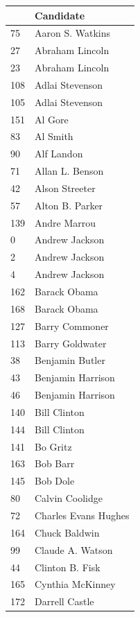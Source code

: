\documentclass[
  letterpaper,
  DIV=11,
  numbers=noendperiod]{scrreprt}
\begin{document}
\begin{tabular}{ll}
\toprule
{} &               Candidate \\
\midrule
75  &        Aaron S. Watkins \\
27  &         Abraham Lincoln \\
23  &         Abraham Lincoln \\
108 &         Adlai Stevenson \\
105 &         Adlai Stevenson \\
151 &                 Al Gore \\
83  &                Al Smith \\
90  &              Alf Landon \\
71  &         Allan L. Benson \\
42  &          Alson Streeter \\
57  &         Alton B. Parker \\
139 &            Andre Marrou \\
0   &          Andrew Jackson \\
2   &          Andrew Jackson \\
4   &          Andrew Jackson \\
162 &            Barack Obama \\
168 &            Barack Obama \\
127 &          Barry Commoner \\
113 &         Barry Goldwater \\
38  &         Benjamin Butler \\
43  &       Benjamin Harrison \\
46  &       Benjamin Harrison \\
140 &            Bill Clinton \\
144 &            Bill Clinton \\
141 &                Bo Gritz \\
163 &                Bob Barr \\
145 &                Bob Dole \\
80  &         Calvin Coolidge \\
72  &    Charles Evans Hughes \\
164 &           Chuck Baldwin \\
99  &        Claude A. Watson \\
44  &         Clinton B. Fisk \\
165 &        Cynthia McKinney \\
172 &          Darrell Castle \\

\end{tabular}
\end{document}
